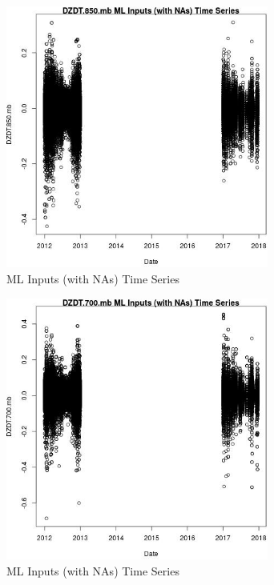 \begin{figure} 
\centering  
\includegraphics[width=0.77\textwidth]{Code_Outputs/Report_ML_input_PM25_Step4_part_e_de_duplicated_aves_compiled_2019-05-14wNAs_DZDT850mbvDate.jpg} 
\caption{\label{fig:Report_ML_input_PM25_Step4_part_e_de_duplicated_aves_compiled_2019-05-14wNAsDZDT850mbvDate}ML Inputs (with NAs) Time Series} 
\end{figure} 
 

\begin{figure} 
\centering  
\includegraphics[width=0.77\textwidth]{Code_Outputs/Report_ML_input_PM25_Step4_part_e_de_duplicated_aves_compiled_2019-05-14wNAs_DZDT700mbvDate.jpg} 
\caption{\label{fig:Report_ML_input_PM25_Step4_part_e_de_duplicated_aves_compiled_2019-05-14wNAsDZDT700mbvDate}ML Inputs (with NAs) Time Series} 
\end{figure} 
 

